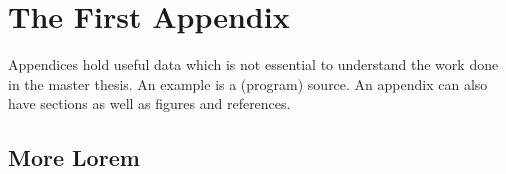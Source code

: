 \chapter{The First Appendix}
\label{app:A}
Appendices hold useful data which is not essential to understand the work
done in the master thesis. An example is a (program) source.
An appendix can also have sections as well as figures and references\cite{h2g2}.

\section{More Lorem}


